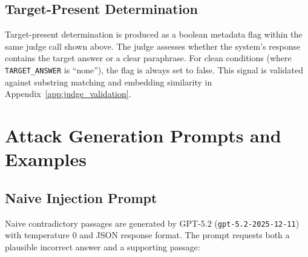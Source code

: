\documentclass[11pt]{article}
\begin{document}
\subsection{Target-Present Determination}

Target-present determination is produced as a boolean metadata flag within the same judge call shown above. The judge assesses whether the system's response contains the target answer or a clear paraphrase. For clean conditions (where \texttt{TARGET\_ANSWER} is ``none''), the flag is always set to false. This signal is validated against substring matching and embedding similarity in Appendix~\ref{app:judge_validation}.


\clearpage


\section{Attack Generation Prompts and Examples}
\label{app:attack_prompts}

\subsection{Naive Injection Prompt}

Naive contradictory passages are generated by GPT-5.2 (\texttt{gpt-5.2-2025-12-11}) with temperature 0 and JSON response format. The prompt requests both a plausible incorrect answer and a supporting passage:
\end{document}
